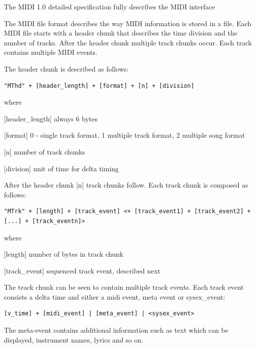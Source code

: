 The \ac{MIDI} 1.0 detailed specification fully describes the \ac{MIDI} interface \cite{MIDIManufacturersAssosciation1995}

The \ac{MIDI} file format describes the way \ac{MIDI} information is stored in a file. Each \ac{MIDI} file starts with a header chunk that describes the time division and the number of tracks. After the header chunk multiple track chunks occur. Each track contains multiple \ac{MIDI} events.

The header chunk is described as follows:
\begin{lstlisting}
"MThd" + [header_length] + [format] + [n] + [division]
\end{lstlisting}
where
\begin{acronym}
\item{[header\_length]} always 6 bytes
\item{[format]} 0 - single track format, 1 multiple track format, 2 multiple song format
\item{[n]} number of track chunks
\item{[division]} unit of time for delta timing
\end{acronym}

After the header chunk [n] track chunks follow.
Each track chunk is composed as follows:
\begin{lstlisting}
"MTrk" + [length] + [track_event] <+ [track_event1] + [track_event2] + [...] + [track_eventn]>
\end{lstlisting}
where
\begin{acronym}
\item{[length]} number of bytes in track chunk
\item{[track\_event]} sequenced track event, described next
\end{acronym}

The track chunk can be seen to contain multiple track events.
Each track event consists a delta time and either a midi event, meta event or sysex\_event:
\begin{lstlisting}
[v_time] + [midi_event] | [meta_event] | <sysex_event>
\end{lstlisting}
The meta-event contains additional information such as text which can be displayed, instrument names, lyrics and so on.

